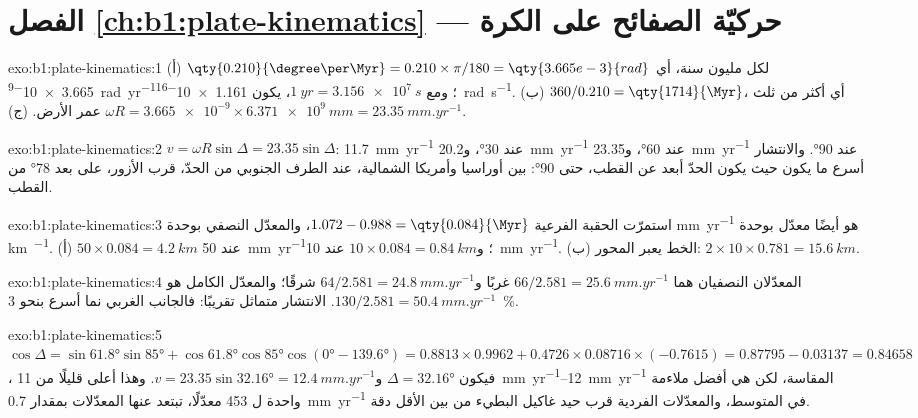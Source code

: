 \section*{الفصل \ref{ch:b1:plate-kinematics} --- حركيّة الصفائح على الكرة}

\begin{solution}{exo:b1:plate-kinematics:1}
(أ) $\qty{0.210}{\degree\per\Myr} = 0.210\times\pi/180 = \qty{3.665e-3}{rad}$
لكل مليون سنة، أي \qty{3.665e-9}{rad.yr^{-1}}؛ ومع $\qty{1}{yr} = \qty{3.156e7}{s}$، يكون \qty{1.161e-16}{rad.s^{-1}}. (ب) $360/0.210 =
\qty{1714}{\Myr}$، أي أكثر من ثلث عمر الأرض. (ج) $\omega R =
\num{3.665e-9}\times\qty{6.371e9}{mm} = \qty{23.35}{mm.yr^{-1}}$.
\end{solution}

\begin{solution}{exo:b1:plate-kinematics:2}
$v = \omega R\sin\Delta = 23.35\sin\Delta$: \qty{11.7}{mm.yr^{-1}} عند \ang{30}، و\qty{20.2}{mm.yr^{-1}} عند \ang{60}، و\qty{23.35}{mm.yr^{-1}} عند \ang{90}. والانتشار أسرع ما يكون حيث يكون الحدّ أبعد عن القطب، حتى \ang{90}: بين أوراسيا وأمريكا الشمالية، عند الطرف الجنوبي من الحدّ، قرب الأزور، على بعد \ang{78} من القطب.
\end{solution}

\begin{solution}{exo:b1:plate-kinematics:3}
استمرّت الحقبة الفرعية $1.072 - 0.988 = \qty{0.084}{\Myr}$، والمعدّل النصفي بوحدة \unit{mm.yr^{-1}} هو أيضًا معدّل بوحدة \unit{km\per\Myr}. (أ) $50\times0.084 =
\qty{4.2}{km}$ عند \qty{50}{mm.yr^{-1}}؛ و$10\times0.084 = \qty{0.84}{km}$ عند
\qty{10}{mm.yr^{-1}}. (ب) الخط يعبر المحور: $2\times10\times0.781 = \qty{15.6}{km}$.
\end{solution}

\begin{solution}{exo:b1:plate-kinematics:4}
المعدّلان النصفيان هما $66/2.581 = \qty{25.6}{mm.yr^{-1}}$ غربًا و$64/2.581 = \qty{24.8}{mm.yr^{-1}}$ شرقًا؛ والمعدّل الكامل هو
$130/2.581 = \qty{50.4}{mm.yr^{-1}}$. الانتشار متماثل تقريبًا: فالجانب الغربي نما أسرع بنحو \qty{3}{\percent}.
\end{solution}

\begin{solution}{exo:b1:plate-kinematics:5}
$\cos\Delta = \sin\ang{61.8}\sin\ang{85} + \cos\ang{61.8}\cos\ang{85}
\cos(\ang{0} - \ang{139.6}) = 0.8813\times0.9962 + 0.4726\times0.08716\times
(-0.7615) = 0.87795 - 0.03137 = 0.84658$، فيكون $\Delta = \ang{32.16}$ و$v = 23.35\sin\ang{32.16} = \qty{12.4}{mm.yr^{-1}}$. وهذا أعلى قليلًا من \qtyrange{11}{12}{mm.yr^{-1}} المقاسة، لكن  هي أفضل ملاءمة واحدة ل 453 معدّلًا، تبتعد عنها المعدّلات بمقدار \qty{0.7}{mm.yr^{-1}} في المتوسط، والمعدّلات الفردية قرب حيد غاكيل البطيء من بين الأقل دقة.
\end{solution}

